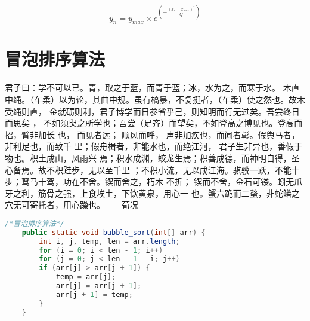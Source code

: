 \begin{equation}
	y_{n}=y_{max} \times e^{\left (-\frac{(x_{n}-x_{max})^{2}}{Q} \right )}
\end{equation}
\section{冒泡排序算法}
君子曰：学不可以已。青，取之于蓝，而青于蓝；冰，水为之，而寒于水。
木直中绳。（车柔）以为轮，其曲中规。虽有槁暴，不复挺者，（车柔）使之然也。故木
受绳则直， 金就砺则利，君子博学而日参省乎己，则知明而行无过矣。吾尝终日而思矣
，  不如须臾之所学也；吾尝（足齐）而望矣，不如登高之博见也。登高而招，臂非加长
也，  而见者远；  顺风而呼，  声非加疾也，而闻者彰。假舆马者，非利足也，而致千
里；假舟楫者，非能水也，而绝江河，  君子生非异也，善假于物也。积土成山，风雨兴
焉；积水成渊，蛟龙生焉；积善成德，而神明自得，圣心备焉。故不积跬步，无以至千里
；不积小流，无以成江海。骐骥一跃，不能十步；驽马十驾，功在不舍。锲而舍之，朽木
不折；  锲而不舍，金石可镂。蚓无爪牙之利，筋骨之强，上食埃土，下饮黄泉，用心一
也。蟹六跪而二螯，非蛇鳝之穴无可寄托者，用心躁也。——荀况
\begin{lstlisting}[language=Java]
	/*冒泡排序算法*/ 
	public static void bubble_sort(int[] arr) {
		int i, j, temp, len = arr.length;
		for (i = 0; i < len - 1; i++)
		for (j = 0; j < len - 1 - i; j++) 
		if (arr[j] > arr[j + 1]) {
			temp = arr[j];
			arr[j] = arr[j + 1];
			arr[j + 1] = temp;
		}
	}
\end{lstlisting}